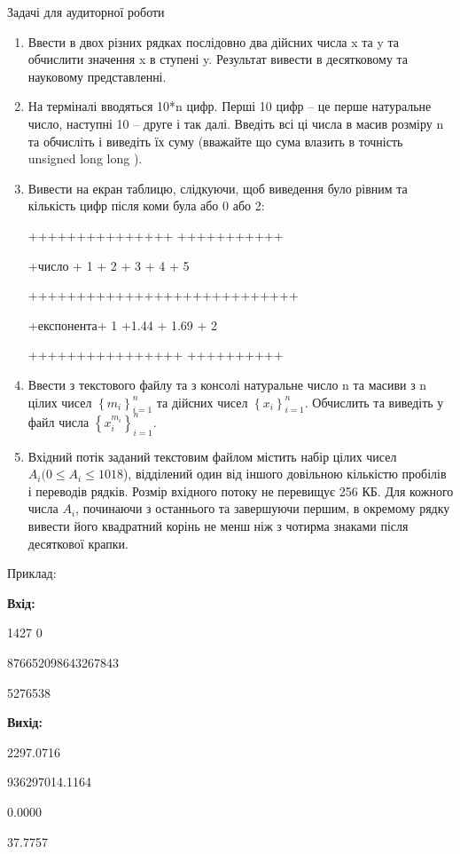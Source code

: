 \documentclass[]{article}
\makeatletter
\newcommand{\xslalph}[1]{\expandafter\@xslalph\csname c@#1\endcsname}
\newcommand{\@xslalph}[1]{%
    \ifcase#1\or а\or б\or в\or г\or д\or e\or є\or ж\or з\or i%
    \or й\or к\or л\or м\or н\or о\or п\or р\or с\or т%
    \or у\or ф\or х\or ц\or ч\or ш\or ю\or я\or аа\or бб\or вв%
    \else\@ctrerr\fi%
}
\makeatother
\begin{document}
\begin{enumerate}
\begin{enumerate}[label=\xslalph*)]
\begin{enumerate}
\begin{enumerate}[label=\xslalph*)]
Задачі для аудиторної роботи

\begin{enumerate}
\def\labelenumi{\arabic{enumi})}
\item
  Ввести в двох різних рядках послідовно два дійсних числа x та y та
  обчислити значення x в ступені y. Результат вивести в десятковому та
  науковому представленні.
\item
  На терміналі вводяться 10*n цифр. Перші 10 цифр -- це перше натуральне
  число, наступні 10 -- друге і так далі. Введіть всі ці числа в масив
  розміру n та обчисліть і виведіть їх суму (вважайте що сума влазить в
  точність unsigned long long ).
\item
  Вивести на екран таблицю, слідкуючи, щоб виведення було рівним та
  кількість цифр після коми була або 0 або 2:

+++++++++++++++ +++++++++++

+число + 1 + 2 + 3 + 4 + 5

++++++++++++++++++++++++++++

+експонента+ 1 +1.44 + 1.69 + 2

++++++++++++++++ ++++++++++

\item
  Ввести з текстового файлу та з консолі натуральне число n та масиви з
  n цілих чисел \(\left\{ m_{i} \right\}_{i = 1}^{n}\) та дійсних чисел
  \(\left\{ x_{i} \right\}_{i = 1}^{n}\). Обчислить та виведіть у файл
  числа \(\left\{ x_{i}^{m_{i}} \right\}_{i = 1}^{n}\).
\item
  Вхідний потік заданий текстовим файлом містить набір цілих чисел $A_i (0
  \le A_i \le 1018$), відділений один від іншого довільною кількістю пробілів
  і переводів рядків. Розмір вхідного потоку не перевищує 256 КБ. Для
  кожного числа $A_i$, починаючи з останнього та завершуючи першим, в
  окремому рядку вивести його квадратний корінь не менш ніж з чотирма
  знаками після десяткової крапки.
\end{enumerate}

Приклад:

\textbf{Вхід:}

1427 0

876652098643267843

5276538

\textbf{Вихід: }

2297.0716

936297014.1164

0.0000

37.7757


\end{enumerate}
\end{enumerate}
\end{enumerate}
\end{enumerate}
\end{document}
